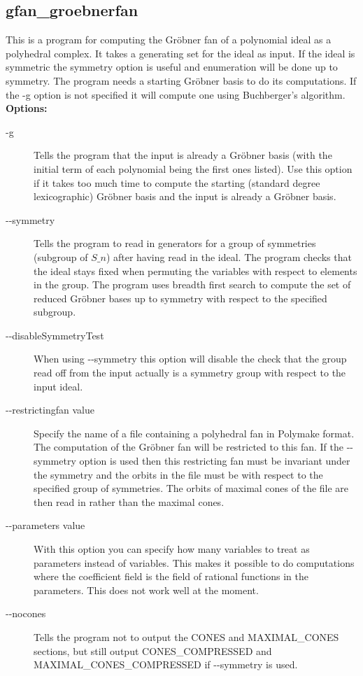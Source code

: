 {{{{{{{{{{{{\subsection{gfan\_groebnerfan}\label{applist:_groebnerfan}
This is a program for computing the Gr\"obner fan of a polynomial ideal as a polyhedral complex. It takes a generating set for the ideal as input. If the ideal is symmetric the symmetry option is useful and enumeration will be done up to symmetry. The program needs a starting Gr\"obner basis to do its computations. If the -g option is not specified it will compute one using Buchberger's algorithm.
\newline
{\bf Options:}
\begin{description}
\item[-g]Tells the program that the input is already a Gr\"obner basis (with the initial term of each polynomial being the first ones listed). Use this option if it takes too much time to compute the starting (standard degree lexicographic) Gr\"obner basis and the input is already a Gr\"obner basis.
\item[-\hspace{0.013cm}-symmetry]Tells the program to read in generators for a group of symmetries (subgroup of $S\_n$) after having read in the ideal. The program checks that the ideal stays fixed when permuting the variables with respect to elements in the group. The program uses breadth first search to compute the set of reduced Gr\"obner bases up to symmetry with respect to the specified subgroup.
\item[-\hspace{0.013cm}-disableSymmetryTest]When using -\hspace{0.013cm}-symmetry this option will disable the check that the group read off from the input actually is a symmetry group with respect to the input ideal.
\item[-\hspace{0.013cm}-restrictingfan value]Specify the name of a file containing a polyhedral fan in Polymake format. The computation of the Gr\"obner fan will be restricted to this fan. If the -\hspace{0.013cm}-symmetry option is used then this restricting fan must be invariant under the symmetry and the orbits in the file must be with respect to the specified group of symmetries. The orbits of maximal cones of the file are then read in rather than the maximal cones.
\item[-\hspace{0.013cm}-parameters value]With this option you can specify how many variables to treat as parameters instead of variables. This makes it possible to do computations where the coefficient field is the field of rational functions in the parameters. This does not work well at the moment.\item[-\hspace{0.013cm}-nocones]Tells the program not to output the CONES and MAXIMAL\_CONES sections, but still output CONES\_COMPRESSED and MAXIMAL\_CONES\_COMPRESSED if -\hspace{0.013cm}-symmetry is used.\end{description}


}}}}}}}}}}}}
